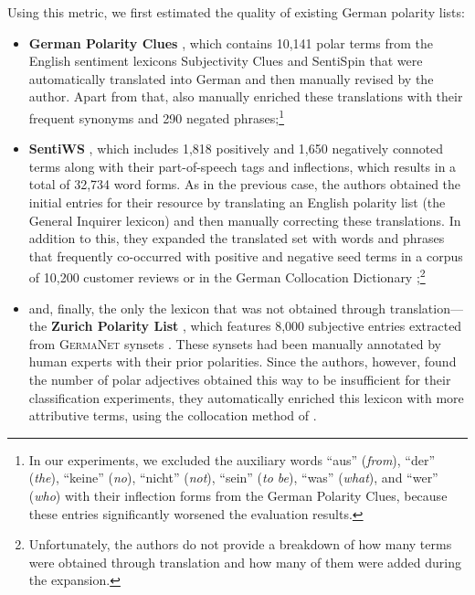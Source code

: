 Using this metric, we first estimated the quality of existing German
polarity lists:
\begin{itemize}
\item\textbf{German Polarity Clues} \cite[GPC;][]{Waltinger:10}, which
  contains 10,141 polar terms from the English sentiment lexicons
  Subjectivity Clues \cite{Wilson:05} and SentiSpin \cite{Takamura:05}
  that were automatically translated into German and then manually
  revised by the author.  Apart from that, \citeauthor{Waltinger:10}
  also manually enriched these translations with their frequent
  synonyms and 290 negated phrases;\footnote{In our experiments, we
    excluded the auxiliary words ``aus'' (\emph{from}), ``der''
    (\emph{the}), ``keine'' (\emph{no}), ``nicht'' (\emph{not}),
    ``sein'' (\emph{to be}), ``was'' (\emph{what}), and ``wer''
    (\emph{who}) with their inflection forms from the German Polarity
    Clues, because these entries significantly worsened the evaluation
    results.}

\item\textbf{SentiWS} \cite[SWS;][]{Remus:10}, which includes 1,818
  positively and 1,650 negatively connoted terms along with their
  part-of-speech tags and inflections, which results in a total of
  32,734 word forms.  As in the previous case, the authors obtained
  the initial entries for their resource by translating an English
  polarity list (the General Inquirer lexicon) and then manually
  correcting these translations.  In addition to this, they expanded
  the translated set with words and phrases that frequently
  co-occurred with positive and negative seed terms in a corpus of
  10,200 customer reviews or in the German Collocation Dictionary
  \cite{Quasthoff:10};\footnote{Unfortunately, the authors do not
    provide a breakdown of how many terms were obtained through
    translation and how many of them were added during the expansion.}

\item and, finally, the only the lexicon that was not obtained through
  translation---the \textbf{Zurich Polarity List}
  \cite[ZPL;][]{Clematide:10}, which features 8,000 subjective entries
  extracted from \textsc{GermaNet} synsets \cite{Hamp:97}.  These
  synsets had been manually annotated by human experts with their
  prior polarities.  Since the authors, however, found the number of
  polar adjectives obtained this way to be insufficient for their
  classification experiments, they automatically enriched this lexicon
  with more attributive terms, using the collocation method of
  \citet{Hatzivassi:97}.
\end{itemize}

